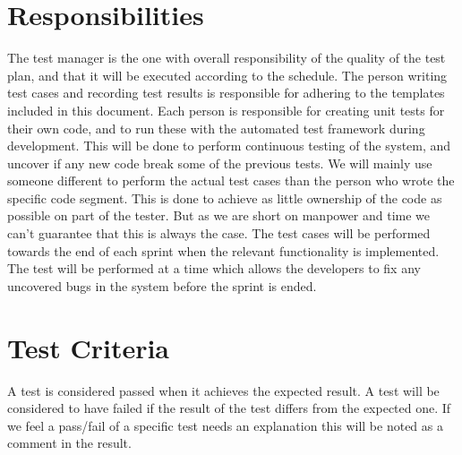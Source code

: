 \section{Responsibilities}
The test manager is the one with overall responsibility of the quality of the test plan, and that it will be executed according to the schedule. The person writing test cases and recording test results is responsible for adhering to the templates included in this document. Each person is responsible for creating unit tests for their own code, and to run these with the automated test framework during development. This will be done to perform continuous testing of the system, and uncover if any new code break some of the previous tests.
\newline
\newline
We will mainly use someone different to perform the actual test cases than the person who wrote the specific code segment. This is done to achieve as little ownership of the code as possible on part of the tester. But as we are short on manpower and time we can’t guarantee that this is always the case. The test cases will be performed towards the end of each sprint when the relevant functionality is implemented. The test will be performed at a time which allows the developers to fix any uncovered bugs in the system before the sprint is ended. 

\section{Test Criteria}
A test is considered passed when it achieves the expected result. A test will be considered to have failed if the result of the test differs from the expected one. If we feel a pass/fail of a specific test needs an explanation this will be noted as a comment in the result.